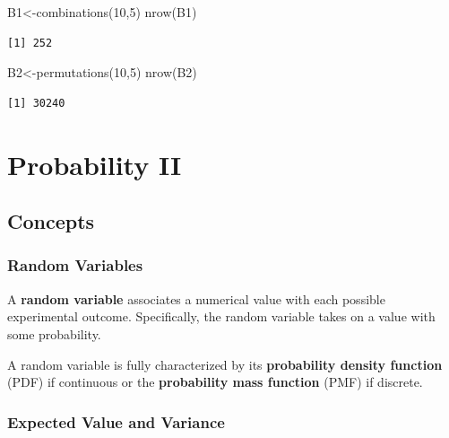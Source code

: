 \documentclass[
  letterpaper,
  DIV=11,
  numbers=noendperiod]{scrreprt}
\newenvironment{Shaded}{\begin{snugshade}}{\end{snugshade}}
\newcommand{\DecValTok}[1]{\textcolor[rgb]{0.68,0.00,0.00}{#1}}
\newcommand{\FunctionTok}[1]{\textcolor[rgb]{0.28,0.35,0.67}{#1}}
\newcommand{\NormalTok}[1]{\textcolor[rgb]{0.00,0.23,0.31}{#1}}
\newcommand{\OtherTok}[1]{\textcolor[rgb]{0.00,0.23,0.31}{#1}}
\begin{document}
\begin{Shaded}
\begin{Highlighting}[numbers=left,,]
\NormalTok{B1}\OtherTok{\textless{}{-}}\FunctionTok{combinations}\NormalTok{(}\DecValTok{10}\NormalTok{,}\DecValTok{5}\NormalTok{)}
\FunctionTok{nrow}\NormalTok{(B1)}
\end{Highlighting}
\end{Shaded}

\begin{verbatim}
[1] 252
\end{verbatim}

\begin{Shaded}
\begin{Highlighting}[numbers=left,,]
\NormalTok{B2}\OtherTok{\textless{}{-}}\FunctionTok{permutations}\NormalTok{(}\DecValTok{10}\NormalTok{,}\DecValTok{5}\NormalTok{)}
\FunctionTok{nrow}\NormalTok{(B2)}
\end{Highlighting}
\end{Shaded}

\begin{verbatim}
[1] 30240
\end{verbatim}

\hypertarget{probability-ii}{%
\chapter{Probability II}\label{probability-ii}}

\hypertarget{concepts-8}{%
\section{Concepts}\label{concepts-8}}

\hypertarget{random-variables}{%
\subsection*{Random Variables}\label{random-variables}}

A \textbf{random variable} associates a numerical value with each
possible experimental outcome. Specifically, the random variable takes
on a value with some probability.

A random variable is fully characterized by its \textbf{probability
density function} (PDF) if continuous or the \textbf{probability mass
function} (PMF) if discrete.

\hypertarget{expected-value-and-variance}{%
\subsection*{Expected Value and
Variance}\label{expected-value-and-variance}}
\end{document}
